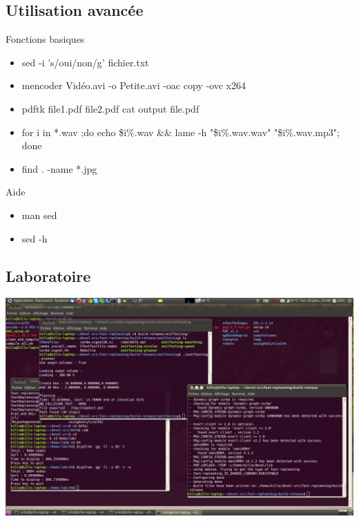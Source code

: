 \documentclass{beamer}
\begin{document}
\subsection{Utilisation avancée}
\begin{frame}
\begin{block}{Fonctions basiques}
\begin{itemize}
\item sed -i 's/oui/non/g' fichier.txt
\item mencoder Vidéo.avi -o Petite.avi -oac copy -ovc x264
\item pdftk file1.pdf file2.pdf cat output file.pdf
\item for i in *.wav ;do echo \${i\%.wav} \&\& lame -h "\${i\%.wav}.wav" "\${i\%.wav}.mp3"; done
\item find . -name *.jpg
\end{itemize}
\end{block}
\begin{block}{Aide}
\begin{itemize}
\item man sed
\item sed -h
\end{itemize}
\end{block}
\end{frame}

\subsection*{Laboratoire}
\begin{frame}
\hspace{-8mm}\begin{minipage}{\linewidth}\includegraphics[width=1.15\linewidth]{images/Boulot}\end{minipage}
\end{frame}
\end{document}
